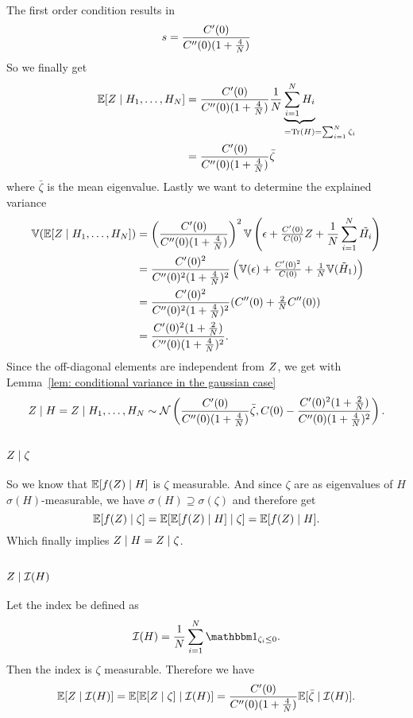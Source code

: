 The first order condition results in
\[
	s = \frac{C'(0)}{C''(0)(1+\tfrac4{N})}
\]
So we finally get
\begin{align*}
	\E[\rf\mid H_1,\dots,H_\dimension]
	&= \frac{\sqC'(0)}{\sqC''(0)(1+\tfrac4{\dimension})}
	\frac1\dimension\underbrace{\sum_{i=1}^\dimension H_i}_{
		=\trace(H) \mathrlap{=\sum_{i=1}^\dimension\zeta_i}
	}\\
	&= \frac{\sqC'(0)}{\sqC''(0)(1+\tfrac4{\dimension})}
	\bar{\zeta}
\end{align*}
where \(\bar{\zeta}\) is the mean eigenvalue. Lastly we want to determine
the explained variance
\begin{align*}
	\mathbb{V}(\mathbb{E}[Z\mid H_1,\dots,H_N])
	&= \left(\frac{C'(0)}{C''(0)(1+\tfrac4{N})}\right)^2
	\mathbb{V}\left(
		\epsilon + \tfrac{C'(0)}{C(0)}Z + \frac{1}{N}\sum_{i=1}^N \tilde{H_i}
	\right)\\
	&= \frac{C'(0)^2}{C''(0)^2(1+\tfrac4{N})^2}
	\left(
		\mathbb{V}(\epsilon) + \tfrac{C'(0)^2}{C(0)} + \tfrac1{N}\mathbb{V}(\tilde{H}_1)
	\right)\\
	&= \frac{C'(0)^2}{C''(0)^2(1+\tfrac4{N})^2}
	(C''(0) + \tfrac2{N}C''(0))\\
	&= \frac{C'(0)^2(1+\tfrac2{N})}{C''(0)(1+\tfrac4{N})^2}.
\end{align*}
Since the off-diagonal elements are independent from \(Z\), we get with
Lemma~\ref{lem: conditional variance in the gaussian case}
\[
	Z\mid H = Z \mid H_1,\dots, H_N \sim \mathcal{N}\left(
		\frac{C'(0)}{C''(0)(1+\tfrac4{N})}\bar{\zeta},
		C(0)-\frac{C'(0)^2(1+\tfrac2{N})}{C''(0)(1+\tfrac4{N})^2}
	\right).
\]

\subsection{\texorpdfstring{\(Z\mid \zeta\)}{Z|Λ}}

So we know that \(\mathbb{E}[f(Z)\mid H]\) is \(\zeta\)
measurable. And since \(\zeta\) are as eigenvalues
of \(H\) \(\sigma(H)\)-measurable, we have \(\sigma(H)\supseteq \sigma(\zeta)\)
and therefore get
\[
	\mathbb{E}[f(Z)\mid \zeta]
	= \mathbb{E}[\mathbb{E}[f(Z)\mid H] \mid \zeta]
	= \mathbb{E}[f(Z)\mid H].
\]
Which finally implies \(Z\mid H = Z\mid \zeta\).

\subsection{\texorpdfstring{\(Z\mid\mathcal{I}(H)\)}{Z|I(H)}}

Let the index be defined as
\[
	\negEV(H)=\frac1{\dimension}\sum_{i=1}^\dimension \ind_{\zeta_i \le 0}.
\]
Then the index is \(\zeta\) measurable. Therefore we have
\[
	\mathbb{E}[Z\mid \mathcal{I}(H)]
	= \mathbb{E}[\mathbb{E}[Z\mid \zeta]\mid \mathcal{I}(H)]
	= \frac{C'(0)}{C''(0)(1+\tfrac4{N})}
	\mathbb{E}[\bar{\zeta}\mid \mathcal{I}(H)].
\]

